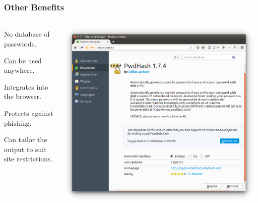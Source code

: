 \documentclass[handout, notes=hide]{beamer}
\begin{document}
\begin{frame}
\frametitle{Other Benefits}
\framesubtitle{}
\setlength{\parskip}{0.5em}

\begin{columns}[T]
\begin{column}[T]{0.5\textwidth}
\setlength{\parskip}{0.5em}

No database of passwords.

Can be used anywhere.

Integrates into the browser.

Protects against phishing.

Can tailor the output to suit site restrictions.

\end{column}
\begin{column}[T]{0.5\textwidth}
\includegraphics[width=1.0\textwidth]{plugin}
\end{column}
\end{columns}

\end{frame}
\note{
\setlength{\parskip}{0.5em}
}

\end{document}

